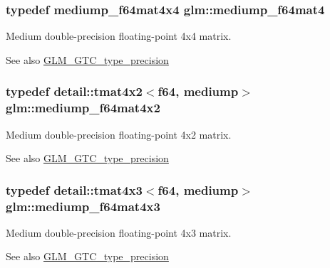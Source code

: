 \subsubsection[{\texorpdfstring{mediump\+\_\+f64mat4}{mediump_f64mat4}}]{\setlength{\rightskip}{0pt plus 5cm}typedef mediump\+\_\+f64mat4x4 {\bf glm\+::mediump\+\_\+f64mat4}}\hypertarget{group__gtc__type__precision_ga2763f655bfe2141a014e66d26a9d2f18}{}\label{group__gtc__type__precision_ga2763f655bfe2141a014e66d26a9d2f18}
Medium double-\/precision floating-\/point 4x4 matrix. \begin{DoxySeeAlso}{See also}
\hyperlink{group__gtc__type__precision}{G\+L\+M\+\_\+\+G\+T\+C\+\_\+type\+\_\+precision} 
\end{DoxySeeAlso}
\subsubsection[{\texorpdfstring{mediump\+\_\+f64mat4x2}{mediump_f64mat4x2}}]{\setlength{\rightskip}{0pt plus 5cm}typedef detail\+::tmat4x2$<$f64, mediump$>$ {\bf glm\+::mediump\+\_\+f64mat4x2}}\hypertarget{group__gtc__type__precision_ga4a7a2b6889f08c9209a4f994fd87cc4e}{}\label{group__gtc__type__precision_ga4a7a2b6889f08c9209a4f994fd87cc4e}
Medium double-\/precision floating-\/point 4x2 matrix. \begin{DoxySeeAlso}{See also}
\hyperlink{group__gtc__type__precision}{G\+L\+M\+\_\+\+G\+T\+C\+\_\+type\+\_\+precision} 
\end{DoxySeeAlso}
\subsubsection[{\texorpdfstring{mediump\+\_\+f64mat4x3}{mediump_f64mat4x3}}]{\setlength{\rightskip}{0pt plus 5cm}typedef detail\+::tmat4x3$<$f64, mediump$>$ {\bf glm\+::mediump\+\_\+f64mat4x3}}\hypertarget{group__gtc__type__precision_ga4a920abfb082b0ffd8d89614cb787021}{}\label{group__gtc__type__precision_ga4a920abfb082b0ffd8d89614cb787021}
Medium double-\/precision floating-\/point 4x3 matrix. \begin{DoxySeeAlso}{See also}
\hyperlink{group__gtc__type__precision}{G\+L\+M\+\_\+\+G\+T\+C\+\_\+type\+\_\+precision} 
\end{DoxySeeAlso}
